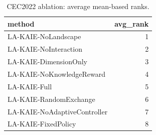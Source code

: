 \begin{table}[t]
\centering
\scriptsize
\caption{CEC2022 ablation: average mean-based ranks.}
\label{tab:cec2022_ablation_ranks}
\begin{tabular}{lr}
\toprule
method & avg\_rank \\
\midrule
LA-KAIE-NoLandscape & 1 \\
LA-KAIE-NoInteraction & 2 \\
LA-KAIE-DimensionOnly & 3 \\
LA-KAIE-NoKnowledgeReward & 4 \\
LA-KAIE-Full & 5 \\
LA-KAIE-RandomExchange & 6 \\
LA-KAIE-NoAdaptiveController & 7 \\
LA-KAIE-FixedPolicy & 8 \\
\bottomrule
\end{tabular}
\end{table}
